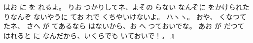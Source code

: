 はお
に
を
れるよ。
りお
つかりしてネ、よその
らない
なんぞに
をかけられたりなんぞ
ないやうに
てお
れで
くちやいけないよ。
ハヽヽ。
おや、
くなつて
たネ、
さへ
が
てあるなら
はないから、お
へ
つておいでな。
あお
が
だつて
はれると
に
なんだから、いくらでも
いておいで！。
』

